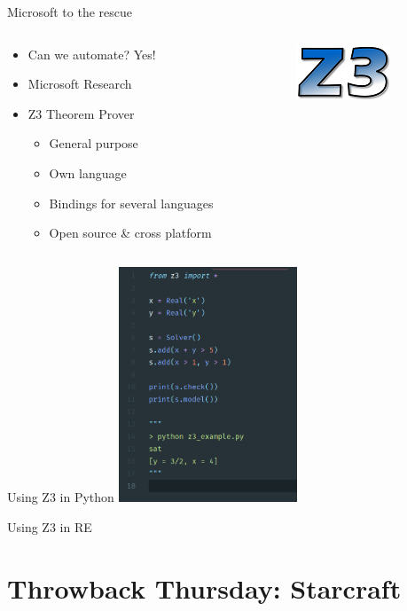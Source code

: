 \documentclass[10pt, compress, aspectratio=169]{beamer}
\begin{document}
\begin{frame}{Microsoft to the rescue}

	\begin{columns}
		\begin{column}{0.6\textwidth}

		\begin{itemize}
		\item Can we automate? Yes!
		\item Microsoft Research
		\item Z3 Theorem Prover
		\begin{itemize}
			\item General purpose
			\item Own language
			\item Bindings for several languages
			\item Open source \& cross platform
		\end{itemize}   
		\end{itemize}   
		
		\end{column}
		\begin{column}{0.4\textwidth}
			\includegraphics{images/z3-logo.png}
		\end{column}
	\end{columns}		

\end{frame}

\begin{frame}{Using Z3 in Python}
  \includegraphics[width=0.4\textwidth]{images/z3-example.png}
\end{frame}


\begin{frame}{Using Z3 in RE}
\section{Throwback Thursday: Starcraft}
\end{frame}
\end{document}
